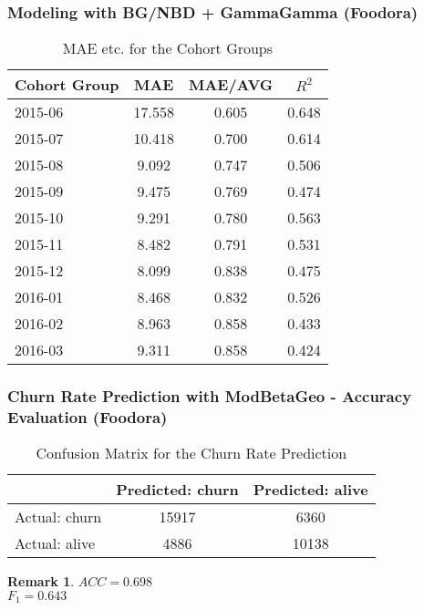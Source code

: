 \documentclass{beamer} %
\theoremstyle{definition} %
\begin{document}
\begin{frame}
\frametitle{Modeling with BG/NBD + GammaGamma (Foodora)}
\begin{center}
            \begin{table}
\begin{tabular}{l | c | c | c }
Cohort Group & MAE & MAE/AVG & $R^2$ \\
\hline \hline
2015-06 & 17.558 & 0.605 & 0.648\\ 
2015-07 & 10.418 & 0.700 & 0.614\\
2015-08 & 9.092 & 0.747 & 0.506\\
2015-09 & 9.475 & 0.769 & 0.474\\ 
2015-10 & 9.291 & 0.780 & 0.563\\ 
2015-11 & 8.482 & 0.791 & 0.531\\
2015-12 & 8.099 & 0.838 & 0.475\\
2016-01 & 8.468 & 0.832 & 0.526\\ 
2016-02 & 8.963 & 0.858 & 0.433\\ 
2016-03 & 9.311 & 0.858 & 0.424\\ 
\end{tabular}
\caption{MAE etc. for the Cohort Groups}
\end{table}
        \end{center}
\end{frame}

\begin{frame}
\frametitle{Churn Rate Prediction with ModBetaGeo - Accuracy Evaluation (Foodora)}
\begin{center}
            \begin{table}
\begin{tabular}{l | c | c }
 & Predicted: churn & Predicted: alive\\
\hline \hline
Actual: churn & 15917 & 6360\\ 
Actual: alive & 4886 & 10138
\end{tabular}
\caption{Confusion Matrix for the Churn Rate Prediction}
\end{table}
        \end{center}
\newtheorem{rmk}{Remark}        
       
\begin{rmk}
	$ACC=0.698$ \\    
    $F_1=0.643$
\end{rmk}
\end{frame}
\end{document}
